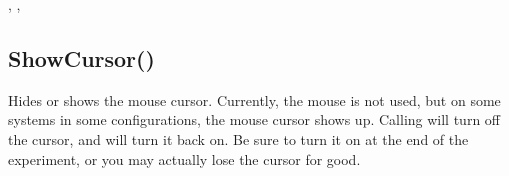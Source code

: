 \documentclass[letterpaper,10pt,english]{sphinxmanual}
\begin{document}
\sphinxAtStartPar
{}

\begin{sphinxVerbatim}[commandchars=\\\{\}]

\end{sphinxVerbatim}

\sphinxAtStartPar
{}

\sphinxAtStartPar
{}, , 

\ignorespaces 

\subsection{ShowCursor()}
\label{\detokenize{reference/peblenvironment:showcursor}}\label{\detokenize{reference/peblenvironment:index-59}}
\sphinxAtStartPar
{}

\sphinxAtStartPar
{}

\sphinxAtStartPar
Hides or shows the mouse cursor.  Currently, the   mouse is not used, but on some systems in some configurations, the   mouse cursor shows up.  Calling  will turn off the   cursor, and  will turn it back on.  Be sure to turn it   on at the end of the experiment, or you may actually lose the cursor   for good.

\sphinxAtStartPar
{}

\begin{sphinxVerbatim}[commandchars=\\\{\}]
\end{sphinxVerbatim}

\sphinxAtStartPar
{}
\end{document}
